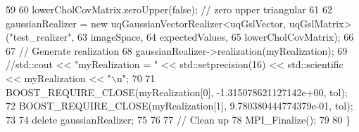 \begin{DoxyCode}
59 
60   lowerCholCovMatrix.zeroUpper(\textcolor{keyword}{false}); \textcolor{comment}{// zero upper triangular }
61 
62   gaussianRealizer = \textcolor{keyword}{new} uqGaussianVectorRealizer<uqGslVector, uqGslMatrix>(\textcolor{stringliteral}{"test\_realizer"}, 
63                                                                                            imageSpace, 
64                                                                                            expectedValues, 
65                                                                                            
      lowerCholCovMatrix);
66 
67   \textcolor{comment}{// Generate realization}
68   gaussianRealizer->realization(myRealization);
69   \textcolor{comment}{//std::cout << "myRealization = " << std::setprecision(16) << std::scientific << myRealization << "\(\backslash\)n";}
70 
71   BOOST\_REQUIRE\_CLOSE(myRealization[0], -1.315078621127142e+00, tol);
72   BOOST\_REQUIRE\_CLOSE(myRealization[1],  9.780380444774379e-01, tol);
73 
74   \textcolor{keyword}{delete} gaussianRealizer;
75 
76 
77   \textcolor{comment}{// Clean up}
78   MPI\_Finalize();
79 
80 \}
\end{DoxyCode}
